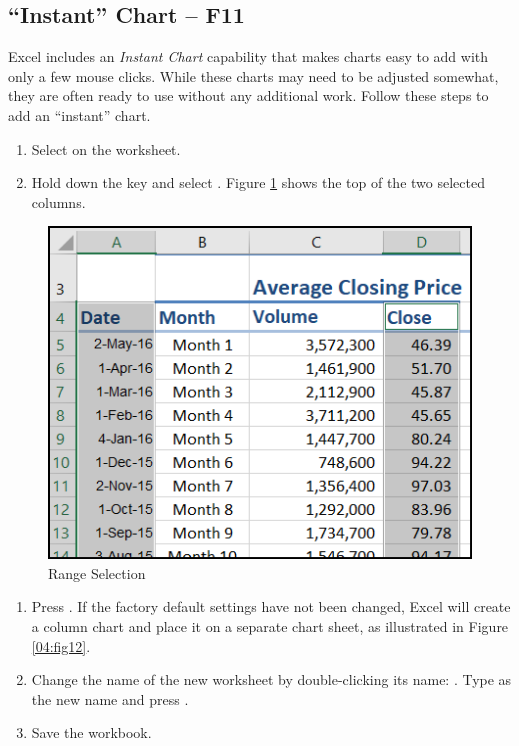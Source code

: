 \subsection{``Instant'' Chart – F11}

Excel includes an \textit{Instant Chart} capability that makes charts easy to add with only a few mouse clicks. While these charts may need to be adjusted somewhat, they are often ready to use without any additional work. Follow these steps to add an ``instant'' chart.

\begin{enumerate}
	\item Select  on the  worksheet.
	\item Hold down the  key and select . Figure \ref{04:fig11} shows the top of the two selected columns.
\end{enumerate}

\begin{figure}[H]
	\centering
	\includegraphics[width=\maxwidth{.65\linewidth}]{gfx/ch04_fig11}
	\caption{Range Selection}
	\label{04:fig11}
\end{figure}

\begin{enumerate}[resume]
	\item Press . If the factory default settings have not been changed, Excel will create a column chart and place it on a separate chart sheet, as illustrated in Figure \ref{04:fig12}.
	\item Change the name of the new worksheet by double-clicking its name: . Type  as the new name and press .
	\item Save the  workbook.
\end{enumerate}

